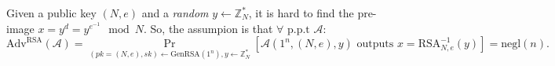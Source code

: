 \begin{definition}
    Given a public key \((N,e)\) and a \emph{random} \(y \gets \mathbb{Z}_N^*\), it is hard to find the pre-image \(x=y^d=y^{e^{-1}} \mod N\). So, the assumpion is that \(\forall \text{ p.p.t } \mathcal{A}\):
    \[
        \text{Adv}^{\text{RSA} } (\mathcal{A}) = \Pr_{(pk=(N,e), sk) \gets \text{GenRSA}(1^n), y \gets \mathbb{Z}_N^* } \left[ \mathcal{A}(1^n, (N, e), y) \text{ outputs } x=\text{RSA}_{N,e}^{-1}(y) \right] = \text{negl} (n).
    \] 
\end{definition}